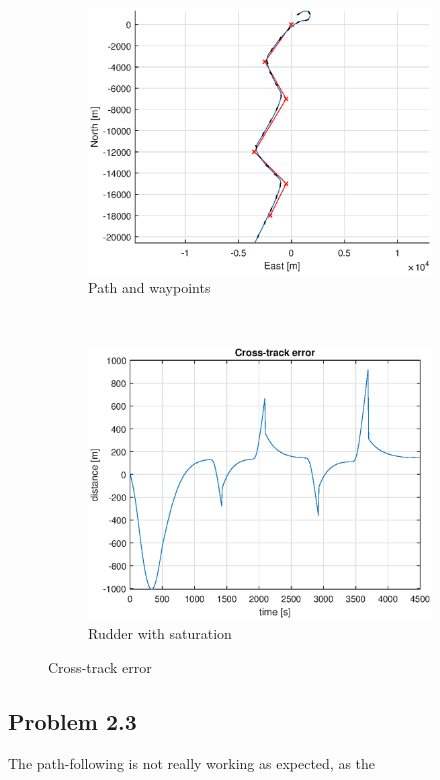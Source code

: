 \begin{figure}[ht]
	\begin{subfigure}[b]{0.4\textwidth}
		\includegraphics[width=\textwidth]{path_2_2}
		\caption{Path and waypoints}
		\label{fig:path_2_2}
	\end{subfigure}%
        ~
	\begin{subfigure}[b]{0.4\textwidth}
		\includegraphics[width=\textwidth]{cross_track_error2_2}
		\caption{Rudder with saturation}
		\label{fig:cross_track_error2_2}
	\end{subfigure}
	\caption{Cross-track error}
	\label{fig:task2_2}
\end{figure}

\subsection*{Problem 2.3}
The path-following is not really working as expected, as the 
